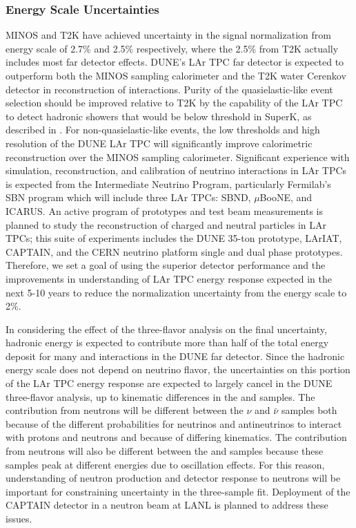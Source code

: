 \subsubsection{\nue Energy Scale Uncertainties}
\label{sec:syst_just_fd}
MINOS and T2K have achieved uncertainty in the \nue signal normalization from \nue energy scale
of 2.7\% and 2.5\% respectively,
where the 2.5\% from T2K actually includes most far detector effects. DUNE's LAr TPC far detector
is expected to outperform both the MINOS sampling calorimeter and the T2K water Cerenkov detector
in reconstruction of \nue interactions. Purity of the quasielastic-like event selection
should be improved relative to T2K by the capability of the LAr TPC to detect hadronic showers
that would be below threshold in SuperK, as described in \cite{Mosel-Lalakulich-Gallmeister:2014}. For non-quasielastic-like
events, the low thresholds and high resolution of the DUNE LAr TPC will significantly improve
calorimetric reconstruction over the MINOS sampling calorimeter.
Significant experience with simulation, reconstruction, and calibration
of neutrino interactions in LAr TPCs is expected from the Intermediate Neutrino Program, particularly
Fermilab's SBN program which will include three LAr TPCs: SBND, $\mu$BooNE, and ICARUS. An active program of
prototypes and test beam measurements is planned to study the reconstruction of charged and neutral particles
in LAr TPCs; this suite of experiments includes the DUNE 35-ton prototype, LArIAT, CAPTAIN, and
the CERN neutrino platform single and dual phase prototypes.
Therefore, we set a goal of using the superior detector performance and the improvements
in understanding of LAr TPC energy response expected in the next 5-10 years to reduce the normalization uncertainty
from the \nue energy scale to 2\%.

In considering the effect of the three-flavor analysis on the final uncertainty, hadronic energy is expected
to contribute more than half of the total energy deposit for many \nue and \numu interactions in the DUNE
far detector. Since the hadronic energy scale does not depend on neutrino flavor, the uncertainties on this
portion of the LAr TPC energy response are expected to largely cancel in the DUNE three-flavor analysis, up
to kinematic differences in the \nue and \numu samples.
The contribution from neutrons will be different between the $\nu$ and $\bar{\nu}$
samples both because of the different
probabilities for neutrinos and antineutrinos to interact with protons and neutrons and because of differing
kinematics. The contribution from neutrons will also be different between the \nue and \numu samples because
these samples peak at different energies due to oscillation effects. For this reason, understanding
of neutron production and detector response to neutrons will be important for constraining uncertainty in
the three-sample fit. Deployment of the CAPTAIN detector in a neutron beam at LANL is planned to address
these issues.


